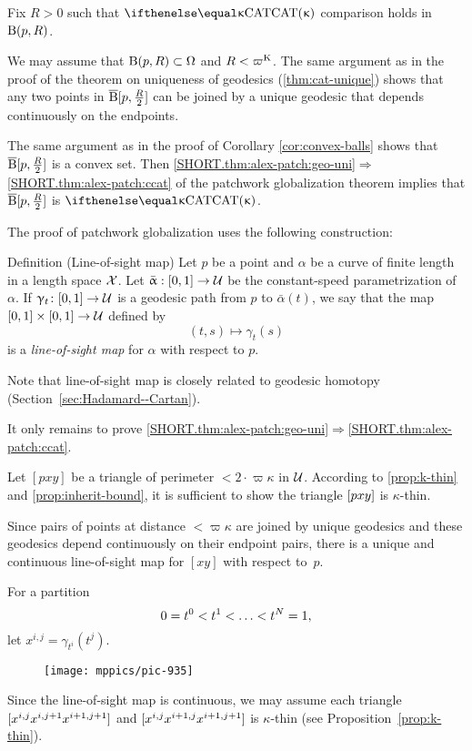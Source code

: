 Fix $R>0$ such that $\CAT\kappa$ comparison holds in $\mathrm{B}{}(p,R)$.

We may assume that $\oBall(p,R)\subset\Omega$ and $R<\varpi\Kappa$.
The same argument as in the proof of the theorem on uniqueness of geodesics (\ref{thm:cat-unique}) 
shows that any two points in $\overline{\mathrm{B}}{}[p,\tfrac R2]$ can be joined by a unique geodesic that depends continuously on the endpoints.

The same argument as in the proof of Corollary \ref{cor:convex-balls} shows that $\overline{\mathrm{B}}{}[p,\tfrac R2]$ is a convex set.
Then \ref{SHORT.thm:alex-patch:geo-uni}$\Rightarrow$\ref{SHORT.thm:alex-patch:ccat} of the patchwork globalization theorem implies that $\overline{\mathrm{B}}{}[p,\tfrac R2]$ is $\CAT\kappa$.
\qeds

The proof of patchwork globalization uses the following construction:

\begin{thm}{Definition (Line-of-sight map)} \label{def:sight}
Let  $p$ be a point and $\alpha$ be a curve of finite length in  a length space $\mathcal{X}$. 
Let $\bar\alpha:[0,1]\to\spc{U}$ be the constant-speed parametrization of $\alpha$.
If $\gamma_t\:[0,1]\to\spc{U}$ is a geodesic path from $p$ to $\bar\alpha(t)$, we say that the map $[0,1]\times[0,1]\to\spc{U}$ defined by
\[(t,s)\mapsto\gamma_t(s)\]
is a \emph{line-of-sight map} for $\alpha$ with respect to $p$.
\end{thm}

Note that line-of-sight map is closely related to geodesic homotopy (Section~\ref{sec:Hadamard--Cartan}).

It only remains to prove \ref{SHORT.thm:alex-patch:geo-uni}$\Rightarrow$\ref{SHORT.thm:alex-patch:ccat}.

Let $[p x y]$ be a triangle of perimeter $<2\cdot\varpi\kappa$  in $\mathcal{U}$. 
According to \ref{prop:k-thin} and \ref{prop:inherit-bound}, it is sufficient to show the triangle $[{p}{x}{y}]$ is $\kappa$-thin.

Since pairs of points at distance $<\varpi\kappa$ are joined by unique geodesics and these geodesics depend continuously on their endpoint pairs, there is a unique and continuous line-of-sight map for  $[x y]$ with respect to~$p$.    

For a partition \[0\z=t^0\z<t^1\z<\z\dots\z<t^N=1,\] 
let $x^{i,j}=\gamma_{t^i}(t^j)$. 
\begin{figure}[!ht]
\vskip0mm
\centering
\texttt{[image: mppics/pic-935]}
\end{figure}
Since the line-of-sight map is continuous, we may assume each triangle $[{x^{i,j}}{x^{i,j+1}}{x^{i+1,j+1}}]$ and $[{x^{i,j}}{x^{i+1,j}}{x^{i+1,j+1}}]$ is $\kappa$-thin 
(see Proposition~\ref{prop:k-thin}).

